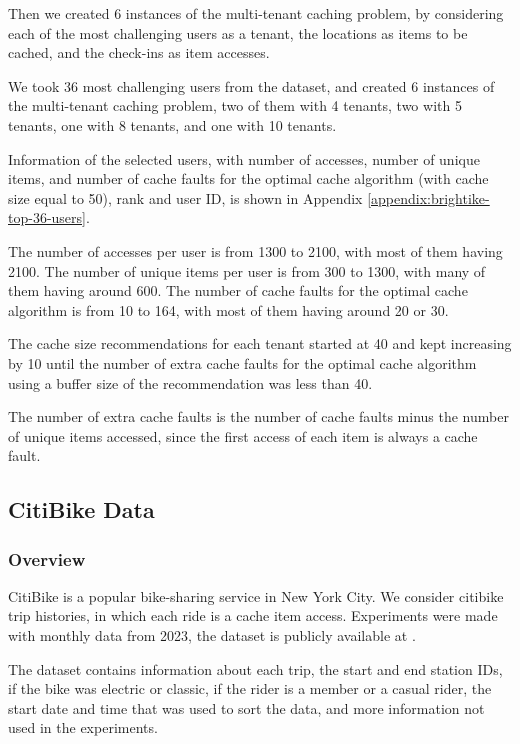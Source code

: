 Then we created 6 instances of the multi-tenant caching problem, by considering each of the most 
challenging users as a tenant, the locations as items to be cached, and the check-ins as item accesses.

We took 36 most challenging users from the dataset, and created 6 instances of the multi-tenant caching
problem, two of them with 4 tenants, two with 5 tenants, one with 8 tenants, and one with 10 tenants.

Information of the selected users, with number of accesses, number of unique items, and number of cache
faults for the optimal cache algorithm (with cache size equal to 50), rank and user ID, is shown in
Appendix \ref{appendix:brightike-top-36-users}.

The number of accesses per user is from 1300 to 2100, with most of them having 2100. The number of
unique items per user is from 300 to 1300, with many of them having around 600. The number of cache
faults for the optimal cache algorithm is from 10 to 164, with most of them having around 20 or 30.

The cache size recommendations for each tenant started at 40 and kept increasing by 10 until 
the number of extra cache faults for the optimal cache algorithm using a buffer size of the 
recommendation was less than 40.

The number of extra cache faults is the number of cache faults minus the number of unique items accessed, 
since the first access of each item is always a cache fault.

\subsection{CitiBike Data}

\subsubsection{Overview}

CitiBike is a popular bike-sharing service in New York City. We consider citibike trip histories, 
in which each ride is a cache item access. Experiments were made with monthly data from 2023, 
the dataset is publicly available at \cite{citibike-data}.

The dataset contains information about each trip, the start and end station IDs, if the bike
was electric or classic, if the rider is a member or a casual rider, 
the start date and time that was used to sort the data, and more information not used in the 
experiments.

